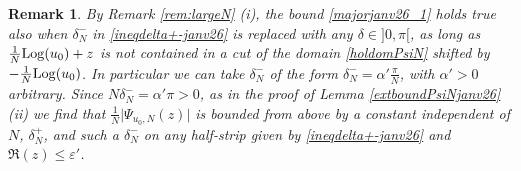 \documentclass[11pt]{amsart}
\newtheorem{remark}[teo]{Remark}
\newcommand{\Log}{{\rm Log}}
\begin{document}
{\begin{remark}
{By Remark \ref{rem:largeN} (i), the bound \eqref{majorjanv26_1} holds true also when $\delta_N^-$ in \eqref{ineqdelta+-janv26} is replaced with any $\delta\in ]0,\pi[$, as long as $\textstyle \frac{1}{N}\Log(u_{0}) +z$ is not contained in a cut of the domain \eqref{holdomPsiN} shifted by $\textstyle -\frac{1}{N}\Log(u_{0})$. In particular we can take $\delta_N^-$ of the form $\delta_N^- = \alpha'\textstyle \frac{\pi}{N}$, with $\alpha'>0$ arbitrary. Since  $N\delta_N^- = \alpha'\pi >0$, as in the proof of Lemma \ref{extboundPsiNjanv26} (ii) we find that $\textstyle \frac{1}{N}\vert {\Psi_{u_0,N}(z)}\vert$ is bounded from above by a constant independent of $N$, $\delta_N^+$, and such a $\delta_N^-$ on any half-strip given by \eqref{ineqdelta+-janv26} and $\textstyle \mathfrak{R}(z)\leq \varepsilon'$.}
\end{remark}

}
\end{document}

